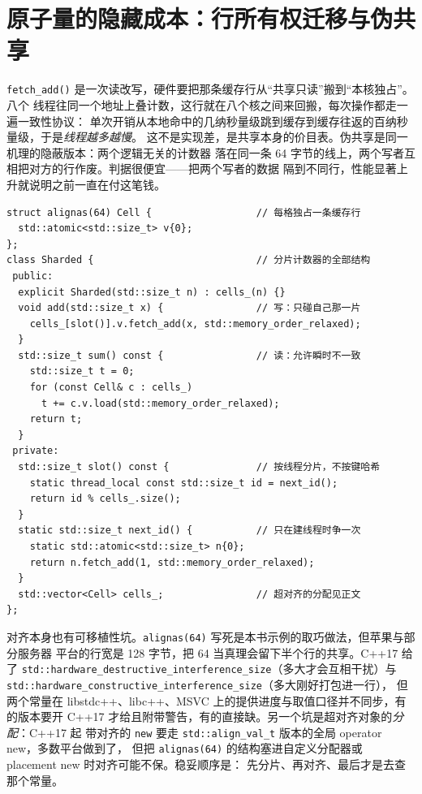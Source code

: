 \documentclass[12pt,a4paper,fontset=fandol]{ctexbook}
\newcommand{\cpp}[1]{C++#1}
\newcommand{\Fn}[1]{\texttt{#1()}}
\newcommand{\Tp}[1]{\texttt{#1}}
\newcommand{\Bk}{\allowbreak}
\begin{document}
\section{原子量的隐藏成本：行所有权迁移与伪共享}

\Fn{fetch\_add} 是一次读改写，硬件要把那条缓存行从``共享只读''搬到``本核独占''。八个
线程往同一个地址上叠计数，这行就在八个核之间来回搬，每次操作都走一遍一致性协议：
单次开销从本地命中的几纳秒量级跳到缓存到缓存往返的百纳秒量级，于是\emph{线程越多越慢}。
这不是实现差，是共享本身的价目表。伪共享是同一机理的隐蔽版本：两个逻辑无关的计数器
落在同一条 64 字节的线上，两个写者互相把对方的行作废。判据很便宜——把两个写者的数据
隔到不同行，性能显著上升就说明之前一直在付这笔钱。
\begin{lstlisting}[style=cppstyle,caption={分片计数器：先按线程分片，再按行对齐}]
struct alignas(64) Cell {                  // 每格独占一条缓存行
  std::atomic<std::size_t> v{0};
};
class Sharded {                            // 分片计数器的全部结构
 public:
  explicit Sharded(std::size_t n) : cells_(n) {}
  void add(std::size_t x) {                // 写：只碰自己那一片
    cells_[slot()].v.fetch_add(x, std::memory_order_relaxed);
  }
  std::size_t sum() const {                // 读：允许瞬时不一致
    std::size_t t = 0;
    for (const Cell& c : cells_)
      t += c.v.load(std::memory_order_relaxed);
    return t;
  }
 private:
  std::size_t slot() const {               // 按线程分片，不按键哈希
    static thread_local const std::size_t id = next_id();
    return id % cells_.size();
  }
  static std::size_t next_id() {           // 只在建线程时争一次
    static std::atomic<std::size_t> n{0};
    return n.fetch_add(1, std::memory_order_relaxed);
  }
  std::vector<Cell> cells_;                // 超对齐的分配见正文
};
\end{lstlisting}

对齐本身也有可移植性坑。\Tp{alignas(64)} 写死是本书示例的取巧做法，但苹果与部分服务器
平台的行宽是 128 字节，把 64 当真理会留下半个行的共享。\cpp{17} 给了
\Tp{std::hardware\Bk\_destructive\Bk\_interference\Bk\_size}（多大才会互相干扰）与
\Tp{std::hardware\Bk\_constructive\Bk\_interference\Bk\_size}（多大刚好打包进一行），
但两个常量在 libstdc++、libc++、MSVC 上的提供进度与取值口径并不同步，有的版本要开
\cpp{17} 才给且附带警告，有的直接缺。另一个坑是超对齐对象的\emph{分配}：\cpp{17} 起
带对齐的 \Tp{new} 要走 \Tp{std::align\_val\_t} 版本的全局 operator new，多数平台做到了，
但把 \Tp{alignas(64)} 的结构塞进自定义分配器或 placement new 时对齐可能不保。稳妥顺序是：
先分片、再对齐、最后才是去查那个常量。
\end{document}
